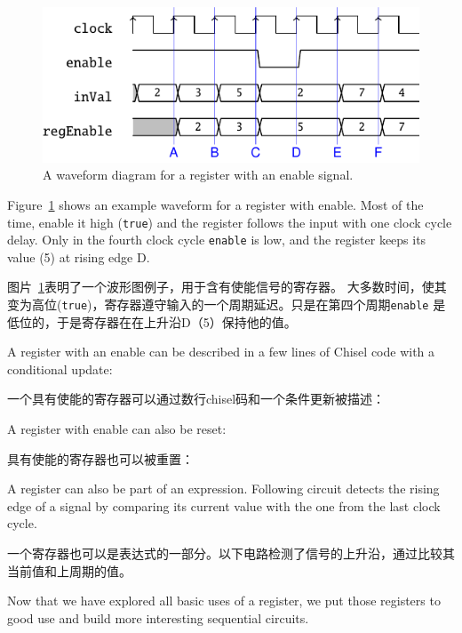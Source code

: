 \documentclass[%
    10pt,
    headinclude, footexclude,
    openright, %
    notitlepage,
    cleardoubleempty,
    headsepline,
    pointlessnumbers,
    bibtotoc, idxtotoc,
    ]{scrbook}
\newcommand{\code}[1]{{\small{\texttt{#1}}}}
\begin{document}
\begin{figure}
  \centering
  \includegraphics[scale=1]{figures/reg_en_wave}
  \caption{A waveform diagram for a register with an enable signal.}
  \label{fig:register-en-wave}
\end{figure}

Figure~\ref{fig:register-en-wave} shows an example waveform for a register
with enable. Most of the time, enable it high (\code{true}) and the register
follows the input with one clock cycle delay. Only in the fourth clock cycle
\code{enable} is low, and the register keeps its value (5) at rising edge D.

图片~\ref{fig:register-en-wave}表明了一个波形图例子，用于含有使能信号的寄存器。
大多数时间，使其变为高位(\code{true})，寄存器遵守输入的一个周期延迟。只是在第四个周期\code{enable}
是低位的，于是寄存器在在上升沿D（5）保持他的值。

A register with an enable can be described in a few lines of Chisel code
with a conditional update:

一个具有使能的寄存器可以通过数行chisel码和一个条件更新被描述：


\noindent A register with enable can also be reset:

\noindent 具有使能的寄存器也可以被重置：


A register can also be part of an expression. Following circuit detects the rising edge
of a signal by comparing its current value with the one from the last clock cycle.

一个寄存器也可以是表达式的一部分。以下电路检测了信号的上升沿，通过比较其当前值和上周期的值。


Now that we have explored all basic uses of a register, we put those registers to
good use and build more interesting sequential circuits.
\end{document}
